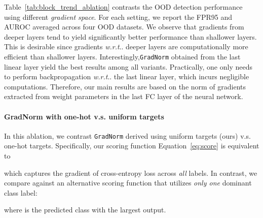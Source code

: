 \documentclass{article}
\makeatletter
\DeclareRobustCommand\onedot{\futurelet\@let@token\@onedot}
\def\@onedot{\ifx\@let@token.\else.\null\fi\xspace}
\def\wrt{\emph{w.r.t}\onedot} \def\dof{d.o.f\onedot}
\makeatother
\begin{document}
Table~\ref{tab:block_trend_ablation} contrasts the OOD detection performance using different \emph{gradient space}. For each setting, we report the FPR95 and AUROC averaged across four OOD datasets. We observe that gradients from deeper layers tend to yield significantly better performance than shallower layers. This is desirable since gradients \wrt deeper layers are computationally more efficient than shallower layers. Interestingly,\texttt{GradNorm} obtained from the last linear layer yield the best results among all variants. Practically, one only needs to perform backpropagation \wrt the last linear layer, which incurs negligible computations. Therefore, our main results are based on the norm of gradients extracted from weight parameters in the last FC layer of the neural network. 


























\vspace{-0.2cm}
\paragraph{{GradNorm} with one-hot v.s. uniform targets}



In this ablation, we contrast \texttt{GradNorm} derived using uniform targets (ours) v.s. one-hot targets. Specifically, our scoring function Equation~\ref{eq:score}  is equivalent to 

which captures the gradient of cross-entropy loss across \emph{all} labels. In contrast, we compare against an alternative scoring function that utilizes \emph{only one} dominant class label:

where  is the predicted class with the largest output. 
\end{document}
